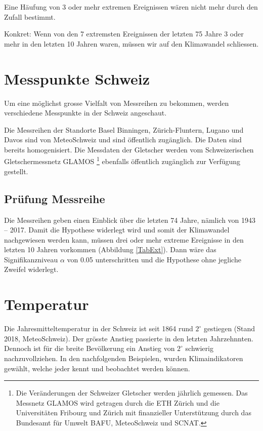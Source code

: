 \begin{refsection}
Eine Häufung von 3 oder mehr extremen Ereignissen wären nicht mehr durch den Zufall bestimmt. 

Konkret: Wenn von den 7 extremsten Ereignissen der letzten 75 Jahre 3 oder mehr in den letzten 10 Jahren waren, müssen wir auf den Klimawandel schliessen.


\section{Messpunkte Schweiz} \label{MesspunkteSchweiz}
Um eine möglichst grosse Vielfalt von Messreihen zu bekommen, werden verschiedene Messpunkte in der Schweiz angeschaut. 


Die Messreihen der Standorte Basel Binningen, Zürich-Fluntern, Lugano und Davos sind von MeteoSchweiz und sind öffentlich zugänglich. Die Daten sind bereits homogenisiert.
Die Messdaten der Gletscher werden vom Schweizerischen Gletschermessnetz GLAMOS \footnote{%
Die Veränderungen der Schweizer Gletscher werden jährlich gemessen. Das Messnetz GLAMOS wird getragen durch die ETH Zürich und die Universitäten Fribourg und Zürich mit finanzieller Unterstützung durch das Bundesamt für Umwelt BAFU, MeteoSchweiz und SCNAT.} ebenfalls öffentlich zugänglich zur Verfügung gestellt.


\subsection{Prüfung Messreihe}
Die Messreihen geben einen Einblick über die letzten 74 Jahre, nämlich von 1943 -- 2017. Damit die Hypothese widerlegt wird und somit der Klimawandel nachgewiesen werden kann, müssen drei oder mehr extreme Ereignisse in den letzten 10 Jahren vorkommen (Abbildung \ref{TabExt}). Dann wäre das Signifikanzniveau $\alpha$ von 0.05 unterschritten und die Hypothese ohne jegliche Zweifel widerlegt.


\section{Temperatur}
Die Jahresmitteltemperatur in der Schweiz ist seit 1864 rund $2^{\circ}$ gestiegen (Stand 2018, MeteoSchweiz). Der grösste Anstieg passierte in den letzten Jahrzehnnten. Dennoch ist für die breite Bevölkerung ein Anstieg von $2^{\circ}$ schwierig nachzuvollziehen.
In den nachfolgenden Beispielen, wurden Klimaindikatoren gewählt, welche jeder kennt und beobachtet werden können.


\end{refsection}
